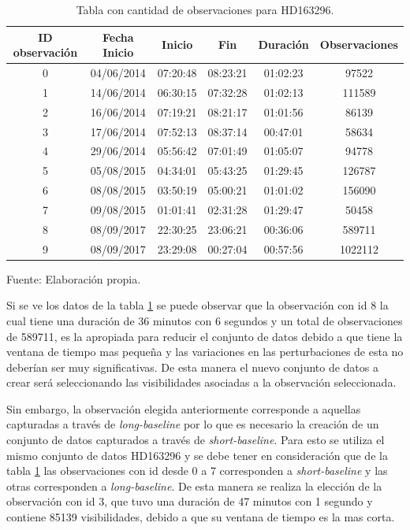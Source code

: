 \begin{table}[!ht]
	\begin{center}
		\caption{Tabla con cantidad de observaciones para HD163296.}
		\begin{tabular}{| c | c | c | c | c | c |}
			\hline
			  ID observación & Fecha Inicio & Inicio & Fin & Duración & Observaciones\\ \hline
			0 & 04/06/2014 & 07:20:48 & 08:23:21 & 01:02:23 & 97522\\ \hline
            1 & 14/06/2014 & 06:30:15 & 07:32:28 & 01:02:13 & 111589\\ \hline
            2 & 16/06/2014 & 07:19:21 & 08:21:17 & 01:01:56 & 86139\\ \hline
            3 & 17/06/2014 & 07:52:13 & 08:37:14 & 00:47:01 & 58634\\ \hline
            4 & 29/06/2014 & 05:56:42 & 07:01:49 & 01:05:07 & 94778\\ \hline
            5 & 05/08/2015 & 04:34:01 & 05:43:25 & 01:29:45 & 126787\\ \hline
            6 & 08/08/2015 & 03:50:19 & 05:00:21 & 01:01:02 & 156090\\ \hline
            7 & 09/08/2015 & 01:01:41 & 02:31:28 & 01:29:47 & 50458\\ \hline
            8 & 08/09/2017 & 22:30:25 & 23:06:21 & 00:36:06 & 589711\\ \hline
            9 & 08/09/2017 & 23:29:08 & 00:27:04 & 00:57:56 & 1022112\\ \hline
		\end{tabular}
		\label{tab:observations}
	\end{center}
	\begin{center}
		Fuente: Elaboración propia.
	\end{center}
\end{table}

Si se ve los datos de la tabla \ref{tab:observations} se puede observar que la observación con id 8 la cual tiene una duración de 36 minutos con 6 segundos y un total de observaciones de 589711, es la apropiada para reducir el conjunto de datos debido a que tiene la ventana de tiempo mas pequeña y las variaciones en las perturbaciones de esta no deberían ser muy significativas. De esta manera el nuevo conjunto de datos a crear será seleccionando las visibilidades asociadas a la observación seleccionada. 

Sin embargo, la observación elegida anteriormente corresponde a aquellas capturadas a través de \textit{long-baseline} por lo que es necesario la creación de un conjunto de datos capturados a través de \textit{short-baseline}. Para esto se utiliza el mismo conjunto de datos HD163296 y se debe tener en consideración que de la tabla \ref{tab:observations} las observaciones con id desde 0 a 7 corresponden a \textit{short-baseline} y las otras corresponden a \textit{long-baseline}. De esta manera se realiza la elección de la observación con id 3, que tuvo una duración de 47 minutos con 1 segundo y contiene 85139 visibilidades, debido a que su ventana de tiempo es la mas corta. 


